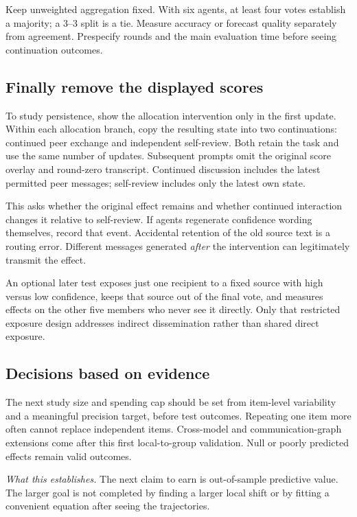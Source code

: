 \documentclass[11pt]{article}
\newcommand{\takeaway}[1]{\par\smallskip\noindent\textit{What this establishes.} #1\par\medskip}
\begin{document}
Keep unweighted aggregation fixed. With six agents, at least four votes establish a majority; a 3--3 split is a tie. Measure accuracy or forecast quality separately from agreement. Prespecify rounds and the main evaluation time before seeing continuation outcomes.

\subsection{Finally remove the displayed scores}
To study persistence, show the allocation intervention only in the first update. Within each allocation branch, copy the resulting state into two continuations: continued peer exchange and independent self-review. Both retain the task and use the same number of updates. Subsequent prompts omit the original score overlay and round-zero transcript. Continued discussion includes the latest permitted peer messages; self-review includes only the latest own state.

This asks whether the original effect remains and whether continued interaction changes it relative to self-review. If agents regenerate confidence wording themselves, record that event. Accidental retention of the old source text is a routing error. Different messages generated \emph{after} the intervention can legitimately transmit the effect.

An optional later test exposes just one recipient to a fixed source with high versus low confidence, keeps that source out of the final vote, and measures effects on the other five members who never see it directly. Only that restricted exposure design addresses indirect dissemination rather than shared direct exposure.

\subsection{Decisions based on evidence}
The next study size and spending cap should be set from item-level variability and a meaningful precision target, before test outcomes. Repeating one item more often cannot replace independent items. Cross-model and communication-graph extensions come after this first local-to-group validation. Null or poorly predicted effects remain valid outcomes.

\takeaway{The next claim to earn is out-of-sample predictive value. The larger goal is not completed by finding a larger local shift or by fitting a convenient equation after seeing the trajectories.}
\end{document}
